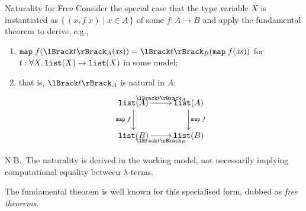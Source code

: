 \begin{frame}{Naturality for Free \cite{Wadler1989}}
  Consider the special case that the type variable $X$ is instantiated as $\{\,(x, f\;x) \mid x \in A \,\}$ of some $f\colon A \to B$ and apply the fundamental theorem to derive, e.g.,
  \begin{enumerate}
    \item $\mathtt{map}\;f(\Brackets{t}_A(\mathit{xs}))
      = \Brackets{t}_B(\mathtt{map}\;f(\mathit{xs}))$ for $t : \forall X.\, \mathtt{list}(X) \to \mathtt{list}(X)$ in some model;
    \item that is, $\Brackets{t}_A$ is natural in $A$:
      \[
        \xymatrix{
          \List(A) \ar[r]^{\Brackets{t}_A} \ar[d]_{\mathtt{map}\;f} & \List(A) \ar[d]^{\mathtt{map}\;f} \\
          \List(B) \ar[r]_{\Brackets{t}_B }& \List(B)
        }
      \]
  \end{enumerate}
  N.B.\ The naturality is derived in the working model, not necessarily implying computational equality between $\lambda$-terms.

  The fundamental theorem is well known for this specialised form, dubbed as \emph{free theorems}. 
\end{frame}

